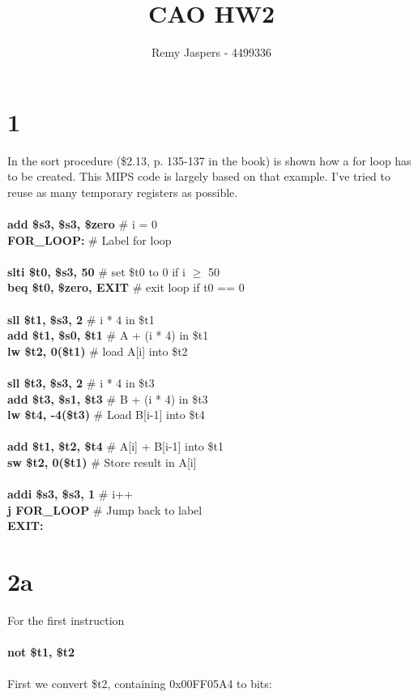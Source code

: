 \documentclass[10pt,a4paper]{article}
\author{Remy Jaspers - 4499336}
\title{CAO HW2}
\begin{document}
	\maketitle
	\section*{1}
	In the sort procedure (\$2.13, p. 135-137 in the book) is shown how a for loop has to be created. This MIPS code is largely based on that example. I've tried to reuse as many temporary registers as possible.\\\\
	\textbf{add \$s3, \$s3, \$zero} \tab \# i = 0  \\
	\textbf{FOR\_LOOP:} \tab \# Label for loop\\\\
	\textbf{slti \$t0, \$s3, 50} \tab \# set \$t0 to 0 if i $\ge$ 50\\	
	\textbf{beq \$t0, \$zero, EXIT} \tab \# exit loop if t0 == 0 \\\\
	\textbf{sll \$t1, \$s3, 2} \tab \# i * 4 in \$t1\\
	\textbf{add \$t1, \$s0, \$t1} \tab \# A + (i * 4) in \$t1\\
	\textbf{lw \$t2, 0(\$t1)} \tab \# load A[i] into \$t2 \\\\
	\textbf{sll \$t3, \$s3, 2} \tab \# i * 4 in \$t3\\
	\textbf{add \$t3, \$s1, \$t3} \tab \# B + (i * 4) in \$t3 \\
	\textbf{lw \$t4, -4(\$t3)} \tab \# Load B[i-1] into \$t4  \\\\
	\textbf{add \$t1, \$t2, \$t4} \tab \# A[i] + B[i-1] into \$t1 \\
	\textbf{sw \$t2, 0(\$t1)} \tab \# Store result in A[i] \\\\
	\textbf{addi \$s3, \$s3, 1} \tab \# i++ \\
	\textbf{j FOR\_LOOP} \tab \# Jump back to label\\
	\textbf{EXIT:}
	\section*{2a}
	For the first instruction \\\\ \textbf{not \$t1, \$t2} \\\\ First we convert \$t2, containing 0x00FF05A4 to bits: \\
	
\end{document}
